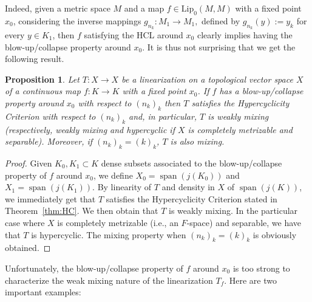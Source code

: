 \documentclass[12pt,english]{amsart}
\numberwithin{equation}{section}
\theoremstyle{plain}
\newtheorem{proposition}[theorem]{Proposition}
\theoremstyle{definition}
\newcommand{\spa}{\operatorname{span}}
\def\lip{ \text{Lip}}
\begin{document}
Indeed, given a metric space $M$ and a map $f\in \lip_0(M,M)$ with a fixed point $x_0$, considering the inverse mappings $g_{n_k}\colon M_1\to M_1,$ defined by $g_{n_k}(y):=y_k$ for every $y\in K_1$, then $f$ satisfying the HCL around $x_0$ clearly implies having the blow-up/collapse property around $x_0$. 
It is thus not surprising that we get the following result.

\begin{proposition}
Let $T\colon X\to X$ be a linearization on a topological vector space $X$ of a continuous map $f\colon K\to K$ with a fixed point $x_0$. If $f$ has a blow-up/collapse property around $x_0$ with respect to $(n_k)_k$ then $T$ satisfies the Hypercyclicity Criterion with respect to $(n_k)_k$ and, in particular, $T$ is weakly mixing (respectively, weakly mixing and hypercyclic if $X$ is completely metrizable and separable). Moreover, if $(n_k)_k=(k)_k$, $T$ is also mixing. 
\end{proposition}

\begin{proof}
    Given $K_0,K_1\subset K$ dense subsets associated to the blow-up/collapse property of $f$ around $x_0$, we define $X_0=\spa (j(K_0))$ and $X_1=\spa (j(K_1))$. By linearity of $T$ and density in $X$ of $\spa (j(K))$, we immediately get that $T$ satisfies the Hypercyclicity Criterion stated in Theorem~\ref{thm:HC}. We then obtain that $T$ is weakly mixing. In the particular case where $X$ is completely metrizable (i.e., an $F$-space) and separable, we have that $T$ is hypercyclic. The mixing property when $(n_k)_k=(k)_k$ is obviously obtained. 
\end{proof}

Unfortunately, the blow-up/collapse property of $f$ around $x_0$ is too strong to characterize the weak mixing nature of the linearization $T_f$. Here are two important examples: 
\end{document}
